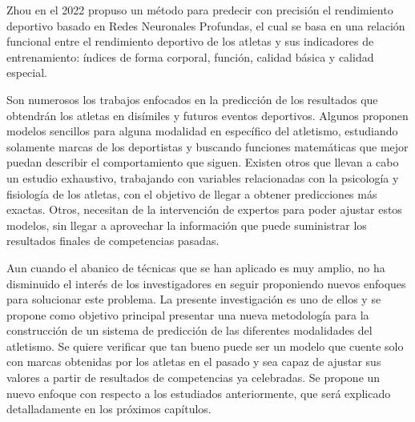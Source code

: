 Zhou en el 2022 \cite{zhou2022sports} propuso un método para predecir con precisión el rendimiento deportivo basado en Redes Neuronales Profundas, el cual se basa en una relación funcional entre el rendimiento deportivo de los atletas y sus indicadores de entrenamiento: índices de forma corporal, función, calidad básica y calidad especial.

Son numerosos los trabajos enfocados en la predicción de los resultados que obtendrán los atletas en disímiles y futuros eventos deportivos. Algunos proponen modelos sencillos para alguna modalidad en específico del atletismo, estudiando solamente marcas de los deportistas y buscando funciones matemáticas que mejor puedan describir el comportamiento que siguen. Existen otros que llevan a cabo un estudio exhaustivo, trabajando con variables relacionadas con la psicología y fisiología de los atletas, con el objetivo de llegar a obtener predicciones más exactas. Otros, necesitan de la intervención de expertos para poder ajustar estos modelos, sin llegar a aprovechar la información que puede suministrar los resultados finales de competencias pasadas.

Aun cuando el abanico de técnicas que se han aplicado es muy amplio, no ha disminuido el interés de los investigadores en seguir proponiendo nuevos enfoques para solucionar este problema. La presente investigación es uno de ellos y se propone como objetivo principal presentar una nueva metodología para la construcción de un sistema de predicción de las diferentes modalidades del atletismo. Se quiere verificar que tan bueno puede ser un modelo que cuente solo con marcas obtenidas por los atletas en el pasado y sea capaz de ajustar sus valores a partir de resultados de competencias ya celebradas. Se propone un nuevo enfoque con respecto a los estudiados anteriormente, que será explicado detalladamente en los próximos capítulos.